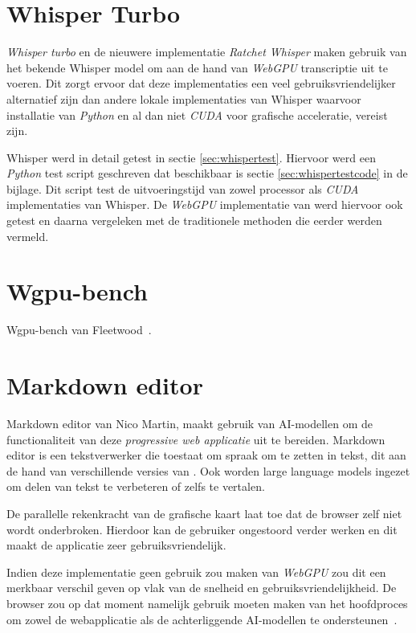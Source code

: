 \section{Whisper Turbo}

\textit{Whisper turbo} en de nieuwere implementatie \textit{Ratchet Whisper} maken gebruik van het bekende Whisper model om aan de hand van \textit{WebGPU} transcriptie uit te voeren. Dit zorgt ervoor dat deze implementaties een veel gebruiksvriendelijker alternatief zijn dan andere lokale implementaties van Whisper waarvoor installatie van \textit{Python} en al dan niet \textit{CUDA} voor grafische acceleratie, vereist zijn. 

\bigbreak{}

Whisper werd in detail getest in sectie \ref{sec:whispertest}. Hiervoor werd een \textit{Python} test script geschreven dat beschikbaar is sectie \ref{sec:whispertestcode} in de bijlage. Dit script test de uitvoeringstijd van zowel processor als \textit{CUDA} implementaties van Whisper. De \textit{WebGPU} implementatie van \textcite{Fleetwood2024} werd hiervoor ook getest en daarna vergeleken met de traditionele methoden die eerder werden vermeld.

\section{Wgpu-bench}

Wgpu-bench van Fleetwood~\autocite{Fleetwood2023d}.

\section{Markdown editor}

Markdown editor van Nico Martin, maakt gebruik van AI-modellen om de functionaliteit van deze \textit{progressive web applicatie} uit te bereiden. Markdown editor is een tekstverwerker die toestaat om spraak om te zetten in tekst, dit aan de hand van verschillende versies van \textcite{radford2022whisper}. Ook worden {large language models} ingezet om delen van tekst te verbeteren of zelfs te vertalen. 

\bigbreak{}

De parallelle rekenkracht van de grafische kaart laat toe dat de browser zelf niet wordt onderbroken. Hierdoor kan de gebruiker ongestoord verder werken en dit maakt de applicatie zeer gebruiksvriendelijk.

\bigbreak{}

Indien deze implementatie geen gebruik zou maken van \textit{WebGPU} zou dit een merkbaar verschil geven op vlak van de snelheid en gebruiksvriendelijkheid. De browser zou op dat moment namelijk gebruik moeten maken van het hoofdproces om  zowel de webapplicatie als de achterliggende AI-modellen te ondersteunen~\autocite{Martin2020}.


